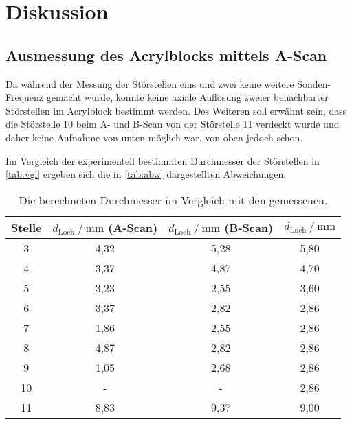 \section{Diskussion}
\label{sec:Diskussion}

\subsection{Ausmessung des Acrylblocks mittels A-Scan}

Da während der Messung der Störstellen eins und zwei keine weitere Sonden-Frequenz gemacht wurde, 
konnte keine axiale Auflösung zweier benachbarter Störstellen im Acrylblock bestimmt werden.
Des Weiteren soll erwähnt sein, dass die Störstelle 10 beim A- und B-Scan von der Störstelle 11 verdeckt wurde und daher keine Aufnahme von unten möglich war, 
von oben jedoch schon.

Im Vergleich der experimentell bestimmten Durchmesser der Störstellen in \autoref{tab:vgl} ergeben sich die in \autoref{tab:abw} dargestellten Abweichungen.
\begin{table}[H]
    \centering
    \caption{Die berechneten Durchmesser im Vergleich mit den gemessenen.}
    \label{tab:vgl}
    \begin{tabular}{c c c c}
        \toprule
        Stelle &
        $d_\text{Loch} \mathbin{/} \unit{\milli\meter}$ (A-Scan) &
        $d_\text{Loch} \mathbin{/} \unit{\milli\meter}$ (B-Scan) & 
        $d_\text{Loch} \mathbin{/} \unit{\milli\meter}$ \\
        \midrule
                3 &             4,32 &             5,28 &           5,80 \\
                4 &             3,37 &             4,87 &           4,70 \\
                5 &             3,23 &             2,55 &           3,60 \\
                6 &             3,37 &             2,82 &           2,86 \\
                7 &             1,86 &             2,55 &           2,86 \\
                8 &             4,87 &             2,82 &           2,86 \\
                9 &             1,05 &             2,68 &           2,86 \\
                10 &               -  &                - &           2,86 \\
                11 &             8,83 &             9,37 &           9,00 \\
        \bottomrule
    \end{tabular}
\end{table}

